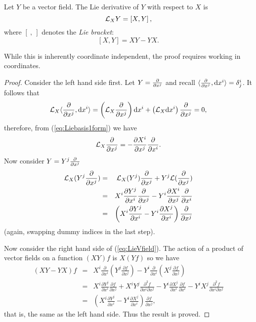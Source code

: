 \begin{thm}
Let $Y$ be a vector field. The Lie derivative of $Y$ with respect to $X$ is
\begin{equation} {\mathcal{L}}_X Y = \left[X,Y\right], \label{eq:LieVfield}\end{equation}
where $[\ ,\ ]$ denotes the \textit{Lie bracket}:
\[ \left[X,Y\right] = XY - YX. \]
\end{thm}
While this is inherently coordinate independent, the proof requires working in coordinates. 

\begin{proof}
Consider the left hand side first. Let $Y=\frac{{\partial}}{{\partial} x^j}$ and recall $\langle\frac{{\partial}}{{\partial} x^j},\mbox{d}x^i\rangle=\delta^i_j$. It follows that
\[
{\mathcal{L}}_X \langle\frac{{\partial}}{{\partial} x^j},\mbox{d}x^i\rangle = \left({\mathcal{L}}_X\frac{{\partial}}{{\partial} x^j}\right)\mbox{d}x^i + \left({\mathcal{L}}_X\mbox{d}x^i\right)\frac{{\partial}}{{\partial} x^j}=0, \]
therefore, from (\ref{eq:Liebasis1form}) we have
\[
{\mathcal{L}}_X\frac{{\partial}}{{\partial} x^j} = -\frac{{\partial} X^i}{{\partial} x^j}\frac{{\partial}}{{\partial} x^i}.
\]
Now consider $Y=Y^j\frac{{\partial}}{{\partial} x^j}$
\begin{eqnarray*}
{\mathcal{L}}_X (Y^j\frac{{\partial}}{{\partial} x^j})&=& {\mathcal{L}}_X(Y^j)\frac{{\partial}}{{\partial} x^j}+Y^j{\mathcal{L}}(\frac{{\partial}}{{\partial} x^j})\\
&=& X^i\frac{{\partial} Y^j}{{\partial} x^i}\frac{{\partial}}{{\partial} x^j}-Y^i\frac{{\partial} X^i}{{\partial} x^j}\frac{{\partial}}{{\partial} x^i} \\
&=& \left(X^i\frac{{\partial} Y^j}{{\partial} x^i}-Y^i\frac{{\partial} X^j}{{\partial} x^i}\right)\frac{{\partial}}{{\partial} x^j}
\end{eqnarray*}
(again, swapping dummy indices in the last step). 

Now consider the right hand side of (\ref{eq:LieVfield}). The action of a product of vector fields on a function $(XY)f$ is $X(Yf)$ so we have
\begin{eqnarray*}
(XY-YX)f &=& X^i \frac{\partial}{\partial x^i}\left(Y^j \frac{\partial f}{\partial x^j}\right) - Y^i \frac{\partial}{\partial x^i}\left(X^j \frac{\partial f}{\partial x^j}\right) \\
&=& X^i \frac{\partial Y^j}{\partial x^i} \frac{\partial f}{\partial x^j} + X^i Y^j \frac{\partial^2 f}{\partial x^i \partial x^j} -Y^i \frac{\partial X^j}{\partial x^i} \frac{\partial f}{\partial x^i} - Y^i X^j \frac{\partial^2 f}{\partial x^i \partial x^j} \\
&=& \left(X^i \frac{\partial Y^j}{\partial x^i}-Y^i \frac{\partial X^j}{\partial x^i}\right) \frac{\partial f}{\partial x^j},
\end{eqnarray*}
that is, the same as the left hand side. Thus the result is proved.
\end{proof}

